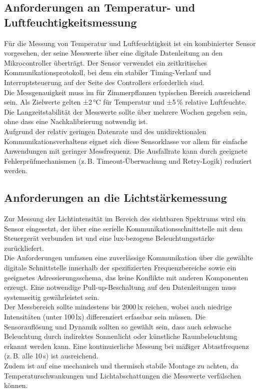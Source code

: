 \subsection{Anforderungen an Temperatur- und Luftfeuchtigkeitsmessung}

Für die Messung von Temperatur und Luftfeuchtigkeit ist ein kombinierter Sensor vorgesehen, der seine Messwerte über eine digitale Datenleitung an den Mikrocontroller überträgt. Der Sensor verwendet ein zeitkritisches Kommunikationsprotokoll, bei dem ein stabiler Timing-Verlauf und Interruptsteuerung auf der Seite des Controllers erforderlich sind.
\\
Die Messgenauigkeit muss im für Zimmerpflanzen typischen Bereich ausreichend sein. Als Zielwerte gelten ±2\,°C für Temperatur und ±5\,\% relative Luftfeuchte. Die Langzeitstabilität der Messwerte sollte über mehrere Wochen gegeben sein, ohne dass eine Nachkalibrierung notwendig ist.
\\
Aufgrund der relativ geringen Datenrate und des unidirektionalen Kommunikationsverhaltens eignet sich diese Sensorklasse vor allem für einfache Anwendungen mit geringer Messfrequenz. Die Ausfallrate kann durch geeignete Fehlerprüfmechanismen (z.\,B. Timeout-Überwachung und Retry-Logik) reduziert werden.

\subsection{Anforderungen an die Lichtstärkemessung}

Zur Messung der Lichtintensität im Bereich des sichtbaren Spektrums wird ein Sensor eingesetzt, der über eine serielle Kommunikationsschnittstelle mit dem Steuergerät verbunden ist und eine lux-bezogene Beleuchtungsstärke zurückliefert.
\\
Die Anforderungen umfassen eine zuverlässige Kommunikation über die gewählte digitale Schnittstelle innerhalb der spezifizierten Frequenzbereiche sowie ein geeignetes Adressierungsschema, das keine Konflikte mit anderen Komponenten erzeugt. Eine notwendige Pull-up-Beschaltung auf den Datenleitungen muss systemseitig gewährleistet sein.
\\
Der Messbereich sollte mindestens bis 2000\,lx reichen, wobei auch niedrige Intensitäten (unter 100\,lx) differenziert erfassbar sein müssen. Die Sensorauflösung und Dynamik sollten so gewählt sein, dass auch schwache Beleuchtung durch indirektes Sonnenlicht oder künstliche Raumbeleuchtung erkannt werden kann. Eine kontinuierliche Messung bei mäßiger Abtastfrequenz (z.\,B. alle 10\,s) ist ausreichend.
\\
Zudem ist auf eine mechanisch und thermisch stabile Montage zu achten, da Temperaturschwankungen und Lichtabschattungen die Messwerte verfälschen können.

